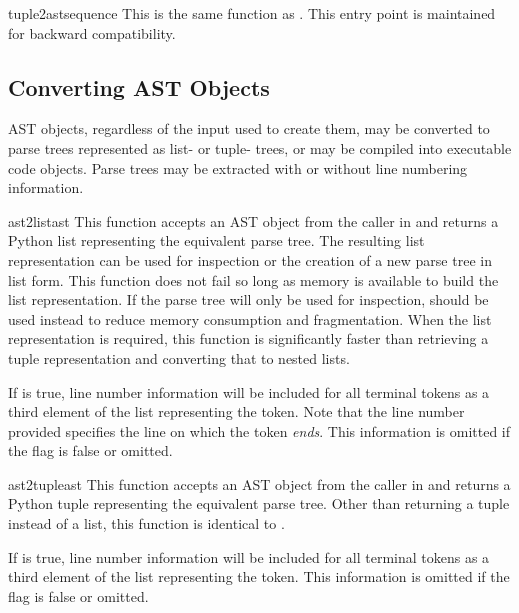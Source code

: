 \begin{funcdesc}{tuple2ast}{sequence}
This is the same function as .  This entry point
is maintained for backward compatibility.
\end{funcdesc}


\subsection{Converting AST Objects \label{Converting ASTs}}

AST objects, regardless of the input used to create them, may be
converted to parse trees represented as list- or tuple- trees, or may
be compiled into executable code objects.  Parse trees may be
extracted with or without line numbering information.

\begin{funcdesc}{ast2list}{ast}
This function accepts an AST object from the caller in
 and returns a Python list representing the
equivalent parse tree.  The resulting list representation can be used
for inspection or the creation of a new parse tree in list form.  This
function does not fail so long as memory is available to build the
list representation.  If the parse tree will only be used for
inspection,  should be used instead to reduce memory
consumption and fragmentation.  When the list representation is
required, this function is significantly faster than retrieving a
tuple representation and converting that to nested lists.

If  is true, line number information will be
included for all terminal tokens as a third element of the list
representing the token.  Note that the line number provided specifies
the line on which the token \emph{ends}.  This information is
omitted if the flag is false or omitted.
\end{funcdesc}

\begin{funcdesc}{ast2tuple}{ast}
This function accepts an AST object from the caller in
 and returns a Python tuple representing the
equivalent parse tree.  Other than returning a tuple instead of a
list, this function is identical to .

If  is true, line number information will be
included for all terminal tokens as a third element of the list
representing the token.  This information is omitted if the flag is
false or omitted.
\end{funcdesc}

